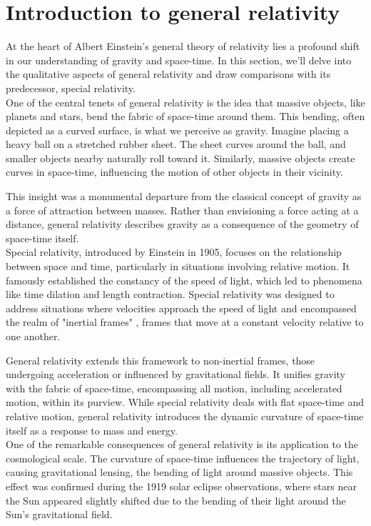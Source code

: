 \section{Introduction to general relativity}

    At the heart of Albert Einstein's general theory of relativity lies a profound shift in our understanding of gravity and space-time. In this section, we'll delve into the qualitative aspects of general relativity and draw comparisons with its predecessor, special relativity.\\

    One of the central tenets of general relativity is the idea that massive objects, like planets and stars, bend the fabric of space-time around them. This bending, often depicted as a curved surface, is what we perceive as gravity. Imagine placing a heavy ball on a stretched rubber sheet. The sheet curves around the ball, and smaller objects nearby naturally roll toward it. Similarly, massive objects create curves in space-time, influencing the motion of other objects in their vicinity.

    This insight was a monumental departure from the classical concept of gravity as a force of attraction between masses. Rather than envisioning a force acting at a distance, general relativity describes gravity as a consequence of the geometry of space-time itself.\\

    Special relativity, introduced by Einstein in 1905, focuses on the relationship between space and time, particularly in situations involving relative motion. It famously established the constancy of the speed of light, which led to phenomena like time dilation and length contraction. Special relativity was designed to address situations where velocities approach the speed of light and encompassed the realm of "inertial frames" , frames that move at a constant velocity relative to one another.

    General relativity extends this framework to non-inertial frames, those undergoing acceleration or influenced by gravitational fields. It unifies gravity with the fabric of space-time, encompassing all motion, including accelerated motion, within its purview. While special relativity deals with flat space-time and relative motion, general relativity introduces the dynamic curvature of space-time itself as a response to mass and energy.\\

    One of the remarkable consequences of general relativity is its application to the cosmological scale. The curvature of space-time influences the trajectory of light, causing gravitational lensing, the bending of light around massive objects. This effect was confirmed during the 1919 solar eclipse observations, where stars near the Sun appeared slightly shifted due to the bending of their light around the Sun's gravitational field.\\

